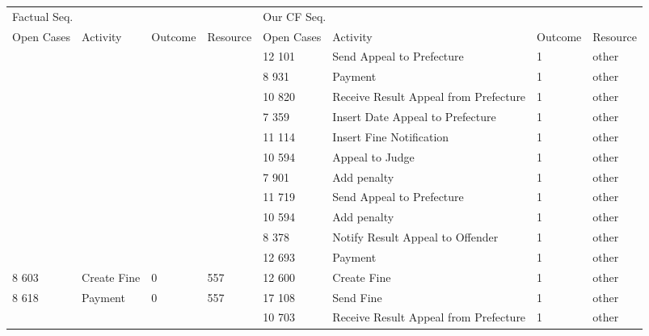 \begin{tabular}{llllllll}
\toprule
\multicolumn{4}{l}{Factual Seq.} & \multicolumn{4}{l}{Our CF Seq.} \\
Open Cases & Activity & Outcome & Resource & Open Cases & Activity & Outcome & Resource \\
\midrule
 &  &  &  & 12 101 & Send Appeal to Prefecture & 1 & other \\
 &  &  &  & 8 931 & Payment & 1 & other \\
 &  &  &  & 10 820 & Receive Result Appeal from Prefecture & 1 & other \\
 &  &  &  & 7 359 & Insert Date Appeal to Prefecture & 1 & other \\
 &  &  &  & 11 114 & Insert Fine Notification & 1 & other \\
 &  &  &  & 10 594 & Appeal to Judge & 1 & other \\
 &  &  &  & 7 901 & Add penalty & 1 & other \\
 &  &  &  & 11 719 & Send Appeal to Prefecture & 1 & other \\
 &  &  &  & 10 594 & Add penalty & 1 & other \\
 &  &  &  & 8 378 & Notify Result Appeal to Offender & 1 & other \\
 &  &  &  & 12 693 & Payment & 1 & other \\
8 603 & Create Fine & 0 & 557 & 12 600 & Create Fine & 1 & other \\
8 618 & Payment & 0 & 557 & 17 108 & Send Fine & 1 & other \\
 &  &  &  & 10 703 & Receive Result Appeal from Prefecture & 1 & other \\
\bottomrule
\end{tabular}

